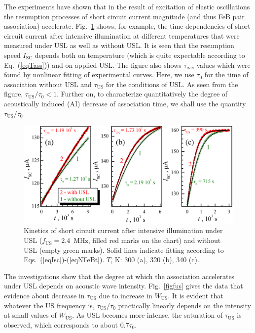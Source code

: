 \documentclass[sn-mathphys]{sn-jnl}%
\theoremstyle{thmstyleone}%
\theoremstyle{thmstyletwo}%
\theoremstyle{thmstylethree}%
\begin{document}
The experiments have shown that in the result of excitation of elastic oscillations
the resumption processes of short circuit current magnitude (and thus FeB pair association) accelerate.
Fig.~\ref{figIscUs} shows, for example, the time dependencies of short circuit current
after intensive illumination at different temperatures
that were measured under USL as well as without USL.
It is seen that the resumption speed $I_\mathrm{SC}$ depends both on temperature
(which is quite expectable according to Eq.~(\ref{eqTass})) and on applied USL.
The figure also shows $\tau_{ass}$ values which were found by nonlinear fitting of experimental curves.
Here, we use $\tau_{0}$ for the time of association without USL
and $\tau_\mathrm{US}$ for the conditions of USL.
As seen from the figure, $\tau_\mathrm{US}/\tau_{0}< 1$.
Further on, to characterize quantitatively the degree of
acoustically induced (AI) decrease of association time, we shall use the quantity $\tau_\mathrm{US}/\tau_{0}$.

\begin{figure}
\centering
 \includegraphics[width=1.0\textwidth]{Fig3}
\caption{
Kinetics of short circuit current  after intensive illumination under USL
($f_\mathrm{US} = 2.4$~MHz, filled red marks on the chart)
and without USL (empty green marks).
Solid lines indicate fitting according to Eqs.~(\ref{eqIsc})-(\ref{eqNFeBt}).
$T$, K: 300 (a), 320 (b), 340 (c).
}
\label{figIscUs}       %
\end{figure}

The investigations show that the degree at which the association accelerates
under USL depends on acoustic wave intensity.
Fig.~\ref{figfus} gives the data that evidence about decrease
in $\tau_\mathrm{US}$ due to increase in $W_\mathrm{US}$.
It is evident that whatever the US frequency is, $\tau_\mathrm{US}/\tau_{0}$
practically linearly depends on the intensity at small values of $W_\mathrm{US}$.
As USL becomes more intense, the saturation of $\tau_\mathrm{US}$ is observed,
which corresponds to about 0.7$\tau_{0}$.
\end{document}

